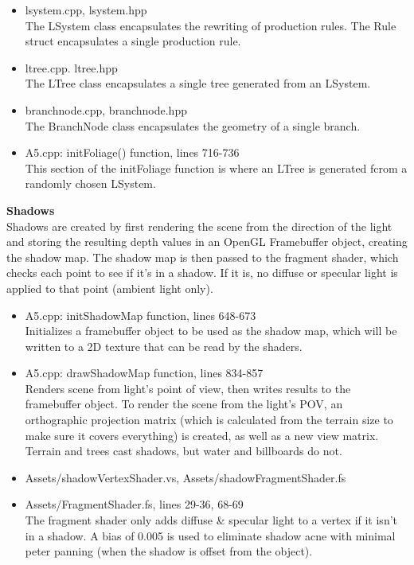 \documentclass{article}
\begin{document}
	\begin{itemize}
	\item\noindent lsystem.cpp, lsystem.hpp \\
	The LSystem class encapsulates the rewriting of production rules. The Rule struct encapsulates a single production rule.
	\item ltree.cpp. ltree.hpp \\
	The LTree class encapsulates a single tree generated from an LSystem.
	\item branchnode.cpp, branchnode.hpp \\
	The BranchNode class encapsulates the geometry of a single branch.
	\item A5.cpp: initFoliage() function, lines 716-736 \\
	This section of the initFoliage function is where an LTree is generated fcrom a randomly chosen LSystem.
	\end{itemize}

	\large\noindent\textbf{Shadows}
	\normalsize
	\\

	Shadows are created by first rendering the scene from the direction of the light and storing the resulting depth values in an OpenGL Framebuffer object, creating the shadow map. The shadow map is then passed to the fragment shader, which checks each point to see if it's in a shadow. If it is, no diffuse or specular light is applied to that point (ambient light only).
	\\

	\begin{itemize}
	\item A5.cpp: initShadowMap function, lines 648-673 \\
	Initializes a framebuffer object to be used as the shadow map, which will be written to a 2D texture that can be read by the shaders.
	\item A5.cpp: drawShadowMap function, lines 834-857 \\
	Renders scene from light's point of view, then writes results to the framebuffer object. To render the scene from the light's POV, an orthographic projection matrix (which is calculated from the terrain size to make sure it covers everything) is created, as well as a new view matrix. Terrain and trees cast shadows, but water and billboards do not.
	\item Assets/shadowVertexShader.vs, Assets/shadowFragmentShader.fs \\
	\item Assets/FragmentShader.fs, lines 29-36, 68-69 \\
	The fragment shader only adds diffuse \& specular light to a vertex if it isn't in a shadow. A bias of 0.005 is used to eliminate shadow acne with minimal peter panning (when the shadow is offset from the object).
	\end{itemize}
\end{document}
